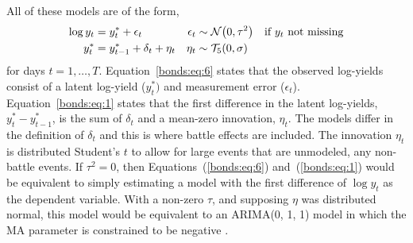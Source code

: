 All of these models are of the form,
\begin{align}
  \label{bonds:eq:6}
  \log y_{t} &= y^{*}_{t} + \epsilon_{t} & \epsilon_{t} &\sim \mathcal{N}\mathopen{}\left(0, \tau^{2}\right)\mathclose{} & \text{if $y_t$ not missing} \\
  \label{bonds:eq:1}
  y^{*}_{t} &= y^{*}_{t - 1} + \delta_{t} + \eta_{t} & \eta_{t} &\sim \mathcal{T}_{5}\mathopen{}\left(0, \sigma\right)\mathclose{}
\end{align}
for days $t = 1, \dots, T$.
Equation~\eqref{bonds:eq:6} states that the observed log-yields consist of a latent log-yield ($y^{*}_{t})$ and measurement error ($\epsilon_{t}$).
Equation~\eqref{bonds:eq:1} states that the first difference in the latent log-yields, $y^{*}_{t} - y^{*}_{t-1}$, is the sum of $\delta_{t}$ and a mean-zero innovation, $\eta_{t}$.
The models differ in the definition of $\delta_{t}$ and this is where battle effects are included.
The innovation $\eta_{t}$ is distributed Student's $t$ to allow for large events that are unmodeled, \ie{}any non-battle events.
If $\tau^{2} = 0$, then Equations~(\ref{bonds:eq:6}) and~(\ref{bonds:eq:1}) would be equivalent to simply estimating a model with the first difference of $\log y_{t}$ as the dependent variable.
With a non-zero $\tau$, and supposing $\eta$ was distributed normal, this model would be equivalent to an ARIMA(0, 1, 1) model in which the MA parameter is constrained to be negative \parencite[91]{PetrisPetroneEtAl2009}.

